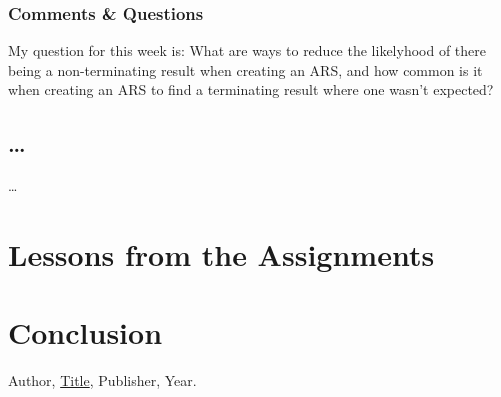 \documentclass{article}
\theoremstyle{theorem}
\theoremstyle{definition}
\theoremstyle{remark}
\begin{document}
\subsubsection{Comments \& Questions}
My question for this week is: What are ways to reduce the likelyhood of there being a non-terminating result when creating an ARS, and how common is it when creating an ARS to find a terminating result where one wasn't expected? 
\subsection{\ldots} 

\ldots

\section{Lessons from the Assignments}





\section{Conclusion}\label{conclusion}


\begin{thebibliography}{99}
 Author, \href{https://en.wikipedia.org/wiki/LaTeX}{Title}, Publisher, Year.
\end{thebibliography}
\end{document}
